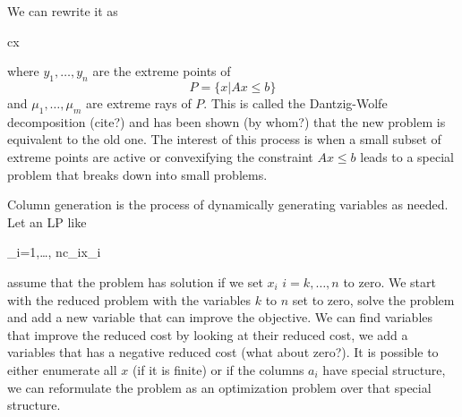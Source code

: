 \documentclass{article}
\begin{document}
	We can rewrite it as 
	
	\begin{mini!}
		{}{c\cdot x}{}{}
	\end{mini!}
	where $y_1,\ldots,y_n$ are the extreme points of 
	\begin{equation}
		P = \{x | Ax \leq b\}
	\end{equation}
	and $\mu_1,\ldots,\mu_m$ are extreme rays of $P$. This is called the Dantzig-Wolfe decomposition (cite?) and has been shown (by whom?) that the new problem is equivalent to the old one. The interest of this process is when a small subset of extreme points are active or convexifying the constraint $Ax \leq b$ leads to a special problem that breaks down into small problems.
	
	
	
	Column generation is the process of dynamically generating variables as needed. Let an LP like 
	\begin{mini!}
		{}{\sum_{i=1,\ldots, n}c_ix_i}{}{}
		\addConstraint{\sum_{i=1,\ldots, n} a^j_ix_i}{\leq b^j}{\quad j \in 1,\ldots,m,}
	\end{mini!}
 	assume that the problem has solution if we set $x_i$ $i=k,\ldots,n$ to zero. We start with the reduced problem with the variables $k$ to $n$ set to zero, solve the problem and add a new variable that can improve the objective. We can find variables that improve the reduced cost by looking at their reduced cost, we add a variables that has a negative reduced cost (what about zero?). It is possible to either enumerate all $x$ (if it is finite) or if the columns $a_i$ have special structure, we can reformulate the problem as an optimization problem over that special structure.
 	
\end{document}

